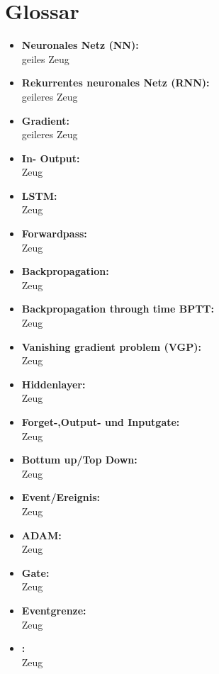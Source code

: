 \chapter{Glossar} 
\label{ch:glossar}
	\begin{itemize}
		\item \textbf{Neuronales Netz (NN):}\\
		geiles Zeug
		\item \textbf{Rekurrentes neuronales Netz (RNN):}\\
		geileres Zeug
		\item \textbf{Gradient:}\\
		geileres Zeug
		\item \textbf{In- Output:}\\
		Zeug
		\item \textbf{LSTM:}\\
		Zeug
		\item \textbf{Forwardpass:}\\
		Zeug
		\item \textbf{Backpropagation:}\\
		Zeug
		\item \textbf{Backpropagation through time BPTT:}\\
		Zeug
		\item \textbf{Vanishing gradient problem (VGP):}\\
		Zeug
		\item \textbf{Hiddenlayer:}\\
		Zeug
		\item \textbf{Forget-,Output- und Inputgate:}\\
		Zeug
		\item \textbf{Bottum up/Top Down:}\\
		Zeug
		\item \textbf{Event/Ereignis:}\\
		Zeug
		\item \textbf{ADAM:}\\
		Zeug
		\item \textbf{Gate:}\\
		Zeug
		\item \textbf{Eventgrenze:}\\
		Zeug
		\item \textbf{:}\\
		Zeug
		
		
		
	
	\end{itemize}